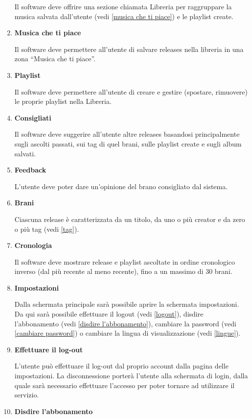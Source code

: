 \documentclass[a4paper,12pt]{article}
\begin{document}
\begin{enumerate}[label=\textbf{RF\arabic*}\;, ref=\textbf{RF\arabic*}]
    Il software deve offrire una sezione chiamata Libreria per raggruppare la musica salvata dall’utente (vedi \ref{musica che ti piace}) e le playlist create.

    \item \label{musica che ti piace} \textbf{Musica che ti piace}
    
    Il software deve permettere all’utente di salvare releases nella libreria in una zona “Musica che ti piace”.
    \item \label{playlist} \textbf{Playlist}
    
    Il software deve permettere all’utente di creare e gestire (spostare, rimuovere) le proprie playlist nella Libreria.
    \item \label{consigliati} \textbf{Consigliati}
    
    Il software deve suggerire all’utente altre releases basandosi principalmente sugli ascolti passati, sui tag di quel brani, sulle playlist create e sugli album salvati.
    \item \label{feedback} \textbf{Feedback}
    
    L’utente deve poter dare un’opinione del brano consigliato dal sistema.
    \item \label{brani} \textbf{Brani}
    
    Ciascuna release è caratterizzata da un titolo, da uno o più creator e da zero o più tag (vedi \ref{tag}).
    \item \label{cronologia} \textbf{Cronologia}
    
    Il software deve mostrare release e playlist ascoltate in ordine cronologico inverso (dal più recente al meno recente), fino a un massimo di 30 brani.
    \item \label{impostazioni} \textbf{Impostazioni}
    
    Dalla schermata principale sarà possibile aprire la schermata impostazioni. Da qui sarà possibile effettuare il logout (vedi \ref{logout}), disdire l'abbonamento (vedi \ref{disdire l'abbonamento}), cambiare la password (vedi \ref{cambiare password}) o cambiare la lingua di visualizzazione (vedi \ref{lingue}).
    \item \label{logout} \textbf{Effettuare il log-out}
    
    L'utente può effettuare il log-out dal proprio account dalla pagina delle impostazioni. La disconnessione porterà l'utente alla schermata di login, dalla quale sarà necessario effettuare l'accesso per poter tornare ad utilizzare il servizio.
    \item \label{disdire l'abbonamento} \textbf{Disdire l'abbonamento}
    

\end{enumerate}
\end{document}
